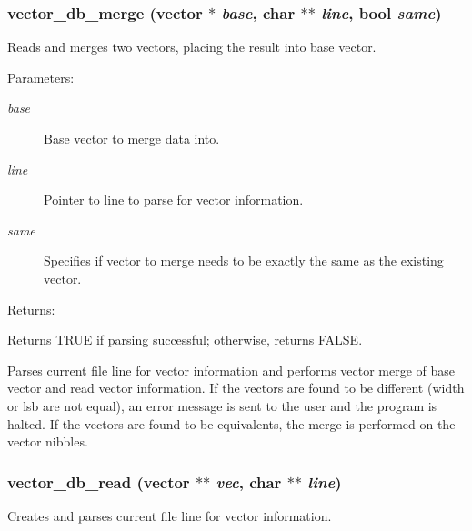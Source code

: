 \subsubsection{ vector\_\-db\_\-merge ({\bf vector} $\ast$ {\em base}, char $\ast$$\ast$ {\em line}, {\bf bool} {\em same})}\label{vector_8h_a5}


Reads and merges two vectors, placing the result into base vector.

\begin{Desc}
\item[Parameters: ]\par
\begin{description}
\item[{\em 
base}]Base vector to merge data into. \item[{\em 
line}]Pointer to line to parse for vector information. \item[{\em 
same}]Specifies if vector to merge needs to be exactly the same as the existing vector.\end{description}
\end{Desc}
\begin{Desc}
\item[Returns: ]\par
Returns TRUE if parsing successful; otherwise, returns FALSE.\end{Desc}
Parses current file line for vector information and performs vector merge of  base vector and read vector information. If the vectors are found to be different (width or lsb are not equal), an error message is sent to the user and the program is halted. If the vectors are found to be equivalents, the merge is performed on the vector nibbles. 
\subsubsection{ vector\_\-db\_\-read ({\bf vector} $\ast$$\ast$ {\em vec}, char $\ast$$\ast$ {\em line})}\label{vector_8h_a4}


Creates and parses current file line for vector information.

